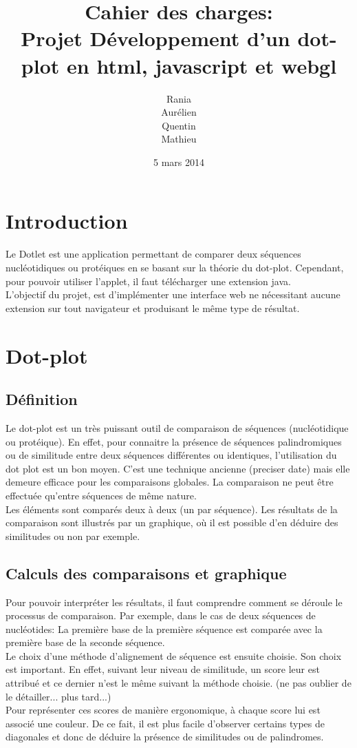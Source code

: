 \documentclass{report}
\title{Cahier des charges: \\Projet Développement d'un dot-plot en html, javascript et webgl }
\author{Rania \bsc{Assab} \\ Aurélien \bsc{Luciani}\\ Quentin \bsc{Riché-Piotaix}\\ Mathieu \bsc{Shaeffer}}
\date{5 mars 2014}
\begin{document}
\maketitle

\tableofcontents
{}

\chapter*{Introduction}

Le Dotlet est une application permettant de comparer deux séquences nucléotidiques ou protéiques en se basant sur la théorie du dot-plot. Cependant, pour pouvoir utiliser l'applet, il faut télécharger une extension java.\\
L'objectif du projet, est d'implémenter une interface web ne nécessitant aucune extension sur tout navigateur et produisant le même type de résultat.\\


\chapter{Dot-plot}

\section{Définition}

Le dot-plot est un très puissant outil de comparaison de séquences (nucléotidique ou protéique). En effet, pour connaitre la présence de séquences palindromiques ou de similitude entre deux séquences différentes ou identiques, l'utilisation du dot plot est un bon moyen. C'est une technique ancienne (preciser date) mais elle demeure efficace pour les comparaisons globales.
La comparaison ne peut être effectuée qu'entre séquences de même nature. \\
Les éléments sont comparés deux à deux (un par séquence). Les résultats de la comparaison sont illustrés par un graphique, où il est possible d'en déduire des similitudes ou non par exemple. \\

\section{Calculs des comparaisons et graphique}

Pour pouvoir interpréter les résultats, il faut comprendre comment se déroule le processus de comparaison. Par exemple, dans le cas de deux séquences de nucléotides:  La première base de la première séquence est comparée avec la première base de la seconde séquence. \\
Le choix d'une méthode d'alignement de séquence est ensuite choisie. Son choix est important. En effet, suivant leur niveau de similitude, un score leur est attribué et ce dernier n'est le même suivant la méthode choisie. (ne pas oublier de le détailler... plus tard...)\\
Pour représenter ces scores de manière ergonomique, à chaque score lui est associé une couleur. De ce fait, il est plus facile d'observer certains types de diagonales et donc de déduire la présence de similitudes ou de palindromes.
\end{document}
